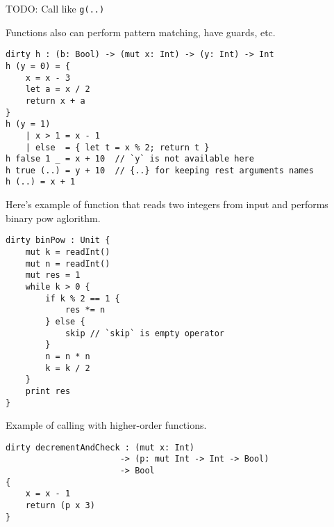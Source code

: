 \documentclass[a4paper]{article}
\begin{document}
TODO: Call like \texttt{g(..) }

Functions also can perform pattern matching, have guards, etc.

\begin{lstlisting}[caption=Pattern matching]
dirty h : (b: Bool) -> (mut x: Int) -> (y: Int) -> Int
h (y = 0) = {
    x = x - 3
    let a = x / 2
    return x + a
}
h (y = 1) 
    | x > 1 = x - 1
    | else  = { let t = x % 2; return t }
h false 1 _ = x + 10  // `y` is not available here
h true (..) = y + 10  // {..} for keeping rest arguments names
h (..) = x + 1
\end{lstlisting}

Here's example of function that reads two integers from input and performs binary pow aglorithm.

\begin{lstlisting}[caption=Binary pow algorithm]
dirty binPow : Unit {
    mut k = readInt()
    mut n = readInt()
    mut res = 1
    while k > 0 {
        if k % 2 == 1 {  
            res *= n
        } else {
            skip // `skip` is empty operator
        }
        n = n * n
        k = k / 2
    }
    print res
}
\end{lstlisting}

Example of calling with higher-order functions.

\begin{lstlisting}[caption=Higher order functions]
dirty decrementAndCheck : (mut x: Int) 
                       -> (p: mut Int -> Int -> Bool) 
                       -> Bool 
{
    x = x - 1
    return (p x 3)  
}
\end{lstlisting}
\end{document}
